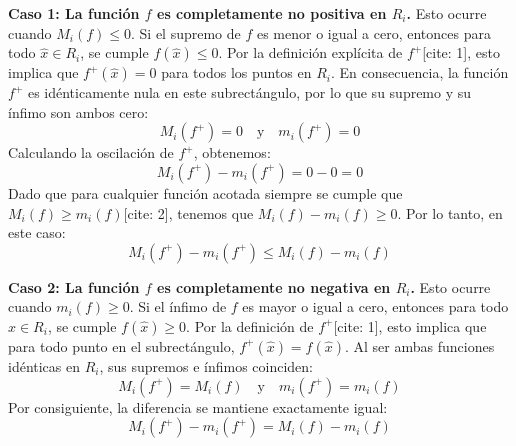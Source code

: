 \documentclass[11pt,letterpaper]{article}
\begin{document}
\textbf{Caso 1: La función $f$ es completamente no positiva en $R_{i}$.}
Esto ocurre cuando $M_{i}(f) \le 0$. Si el supremo de $f$ es menor o igual a cero, entonces para todo $\hat{x} \in R_{i}$, se cumple $f(\hat{x}) \le 0$. 
Por la definición explícita de $f^{+}$[cite: 1], esto implica que $f^{+}(\hat{x}) = 0$ para todos los puntos en $R_{i}$. En consecuencia, la función $f^{+}$ es idénticamente nula en este subrectángulo, por lo que su supremo y su ínfimo son ambos cero:
\begin{equation*}
M_{i}(f^{+}) = 0 \quad \text{y} \quad m_{i}(f^{+}) = 0
\end{equation*}
Calculando la oscilación de $f^{+}$, obtenemos:
\begin{equation*}
M_{i}(f^{+}) - m_{i}(f^{+}) = 0 - 0 = 0
\end{equation*}
Dado que para cualquier función acotada siempre se cumple que $M_{i}(f) \ge m_{i}(f)$[cite: 2], tenemos que $M_{i}(f) - m_{i}(f) \ge 0$. Por lo tanto, en este caso:
\begin{equation*}
M_{i}(f^{+}) - m_{i}(f^{+}) \le M_{i}(f) - m_{i}(f)
\end{equation*}

\textbf{Caso 2: La función $f$ es completamente no negativa en $R_{i}$.}
Esto ocurre cuando $m_{i}(f) \ge 0$. Si el ínfimo de $f$ es mayor o igual a cero, entonces para todo $\hat{x} \in R_{i}$, se cumple $f(\hat{x}) \ge 0$.
Por la definición de $f^{+}$[cite: 1], esto implica que para todo punto en el subrectángulo, $f^{+}(\hat{x}) = f(\hat{x})$. Al ser ambas funciones idénticas en $R_{i}$, sus supremos e ínfimos coinciden:
\begin{equation*}
M_{i}(f^{+}) = M_{i}(f) \quad \text{y} \quad m_{i}(f^{+}) = m_{i}(f)
\end{equation*}
Por consiguiente, la diferencia se mantiene exactamente igual:
\begin{equation*}
M_{i}(f^{+}) - m_{i}(f^{+}) = M_{i}(f) - m_{i}(f)
\end{equation*}
\end{document}
